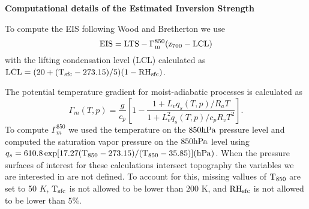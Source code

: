 \documentclass[draft,grl]{agutexSI}
\begin{document}
\begin{article}
\noindent\textbf{Computational details of the Estimated Inversion Strength}


To compute the EIS following Wood and Bretherton we use 
\begin{equation}
  \rm{EIS}=\rm{LTS}-\Gamma_m^{850}(z_{700}-\rm{LCL})
\end{equation}
with the lifting condensation level (LCL) calculated as $\rm{LCL}=(20+(T_{sfc}-273.15)/5)(1-RH_{sfc})$.  


            The potential temperature gradient for moist-adiabatic processes is calculated as
\begin{equation}
    \Gamma_m(T,p)=\frac{g}{c_p} \left[ 1-\frac{1+L_v q_s(T,p)/R_a T}{1+L^2_v q_s(T,p)/c_p R_v T^2} \right].
\end{equation}
            To compute $\Gamma^{850}_m$ we used the temperature on the $850 \rm{hPa}$ pressure level and computed the saturation vapor pressure on the 
            $850 \rm{hPa}$ level using $q_s=610.8 \, \rm{exp}[17.27(T_{850}-273.15)/(T_{850}-35.85)] (\rm{hPa})$.  When the pressure surfaces of interest for these calculations intersect topography 
            the variables we are interested in are not defined.  To account for this, missing vallues of $\rm{T}_{850}$ are set to 50 $K$, $\rm{T}_{sfc}$ is not allowed to be lower than $200$ K, and $\rm{RH}_{sfc}$
            is not allowed to be lower than $5 \%$.            



%






\end{article}
\end{document}
